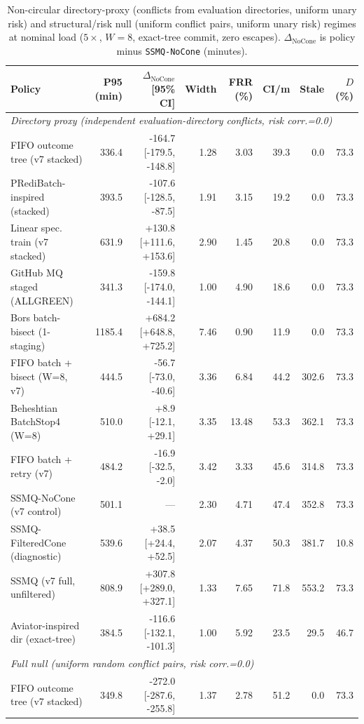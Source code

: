 \begin{table}[t]\centering\scriptsize
\caption{Non-circular directory-proxy (conflicts from evaluation directories, uniform unary risk) and structural/risk null (uniform conflict pairs, uniform unary risk) regimes at nominal load ($5\times$, $W{=}8$, exact-tree commit, zero escapes). $\Delta_{\text{NoCone}}$ is policy minus \texttt{SSMQ-NoCone} (minutes).}\label{tab:v8null}
\begin{tabular}{lrrrrrrr}\toprule
Policy & P95 (min) & $\Delta_{\text{NoCone}}$ [95\% CI] & Width & FRR (\%) & CI/m & Stale & $D$ (\%) \\ \midrule
\multicolumn{8}{l}{\textit{Directory proxy (independent evaluation-directory conflicts, risk corr.=0.0)}} \\
FIFO outcome tree (v7 stacked) & 336.4 & -164.7 [-179.5, -148.8] & 1.28 & 3.03 & 39.3 & 0.0 & 73.3 \\
PRediBatch-inspired (stacked) & 393.5 & -107.6 [-128.5, -87.5] & 1.91 & 3.15 & 19.2 & 0.0 & 73.3 \\
Linear spec. train (v7 stacked) & 631.9 & +130.8 [+111.6, +153.6] & 2.90 & 1.45 & 20.8 & 0.0 & 73.3 \\
GitHub MQ staged (ALLGREEN) & 341.3 & -159.8 [-174.0, -144.1] & 1.00 & 4.90 & 18.6 & 0.0 & 73.3 \\
Bors batch-bisect (1-staging) & 1185.4 & +684.2 [+648.8, +725.2] & 7.46 & 0.90 & 11.9 & 0.0 & 73.3 \\
FIFO batch + bisect (W=8, v7) & 444.5 & -56.7 [-73.0, -40.6] & 3.36 & 6.84 & 44.2 & 302.6 & 73.3 \\
Beheshtian BatchStop4 (W=8) & 510.0 & +8.9 [-12.1, +29.1] & 3.35 & 13.48 & 53.3 & 362.1 & 73.3 \\
FIFO batch + retry (v7) & 484.2 & -16.9 [-32.5, -2.0] & 3.42 & 3.33 & 45.6 & 314.8 & 73.3 \\
SSMQ-NoCone (v7 control) & 501.1 & --- & 2.30 & 4.71 & 47.4 & 352.8 & 73.3 \\
SSMQ-FilteredCone (diagnostic) & 539.6 & +38.5 [+24.4, +52.5] & 2.07 & 4.37 & 50.3 & 381.7 & 10.8 \\
SSMQ (v7 full, unfiltered) & 808.9 & +307.8 [+289.0, +327.1] & 1.33 & 7.65 & 71.8 & 553.2 & 73.3 \\
Aviator-inspired dir (exact-tree) & 384.5 & -116.6 [-132.1, -101.3] & 1.00 & 5.92 & 23.5 & 29.5 & 46.7 \\
\midrule
\multicolumn{8}{l}{\textit{Full null (uniform random conflict pairs, risk corr.=0.0)}} \\
FIFO outcome tree (v7 stacked) & 349.8 & -272.0 [-287.6, -255.8] & 1.37 & 2.78 & 51.2 & 0.0 & 73.3 \\

\end{tabular}
\end{table}
